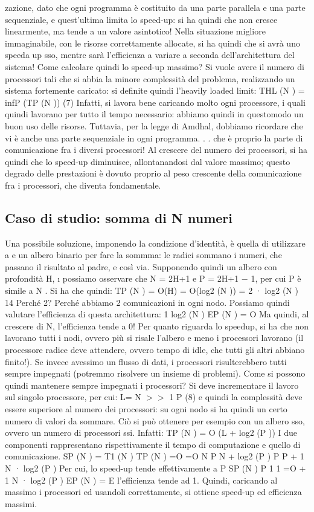 zazione, dato che ogni programma è costituito da una parte parallela e una
parte sequenziale, e quest'ultima limita lo speed-up: si ha quindi che non cresce
linearmente, ma tende a un valore asintotico! Nella situazione migliore immaginabile, con le risorse correttamente
allocate, si ha quindi che si avrà uno speeda
up sso, mentre sarà l'efficienza a variare a seconda dell'architettura del sistema!
Come calcolare quindi lo speed-up massimo? Si vuole avere il numero di
processori tali che si abbia la minore complessità del problema, realizzando un
sistema fortemente caricato: si definite quindi l'heavily loaded limit:
THL (N ) = infP (TP (N ))
(7)
Infatti, si lavora bene caricando molto ogni processore, i quali quindi lavorano
per tutto il tempo necessario: abbiamo quindi in questomodo un buon uso delle
risorse.
Tuttavia, per la legge di Amdhal, dobbiamo ricordare che vi è anche una
parte sequenziale in ogni programma. . . che è proprio la parte di comunicazione
fra i diversi processori! Al crescere del numero dei processori, si ha quindi
che lo speed-up diminuisce, allontanandosi dal valore massimo; questo degrado
delle prestazioni è dovuto proprio al peso crescente della comunicazione fra i
processori, che diventa fondamentale.
\subsection{Caso di studio: somma di N numeri}
Una possibile soluzione, imponendo la condizione d'identità, è quella di utilizzare
a e
un albero binario per fare la sommma: le radici sommano i numeri, che passano
il risultato al padre, e così via. Supponendo quindi un albero con profondità H,
\i{}
possiamo osservare che N = 2H+1 e P = 2H+1 $-$ 1, per cui P è simile a N . Si
ha che quindi:
TP (N ) = O(H)
= O(log2 (N ))
= 2 · log2 (N )
14
Perché 2? Perché abbiamo 2 comunicazioni in ogni nodo. Possiamo quindi
valutare l'efficienza di questa architettura:
1
log2 (N )
EP (N ) = O
Ma quindi, al crescere di N, l'efficienza tende a 0! Per quanto riguarda lo speedup, si ha che non lavorano tutti i
nodi,
ovvero più si risale l'albero e meno i
processori lavorano (il processore radice deve attendere, ovvero tempo di idle,
che tutti gli altri abbiano finito!). Se invece avessimo un flusso di dati, i processori risulterebbero tutti sempre
impegnati (potremmo risolvere un insieme di
problemi).
Come si possono quindi mantenere sempre impegnati i processori? Si deve
incrementare il lavoro sul singolo processore, per cui:
L=
N
$>$$>$ 1
P
(8)
e quindi la complessità deve essere superiore al numero dei processori: su ogni
nodo si ha quindi un certo numero di valori da sommare. Ciò si può ottenere
per esempio con un albero sso, ovvero un numero di processori ssi. Infatti:
TP (N ) = O (L + log2 (P ))
I due componenti rappresentano rispettivamente il tempo di computazione e
quello di comunicazione.
SP (N ) =
T1 (N )
TP (N )
=O
=O
N
P
N
+ log2 (P )
P
P
+
1
N · log2 (P )
Per cui, lo speed-up tende effettivamente a P
SP (N )
P
1
1
=O
+
1 N · log2 (P )
EP (N ) =
E l'efficienza tende ad 1. Quindi, caricando al massimo i processori ed usandoli
correttamente, si ottiene speed-up ed efficienza massimi.
